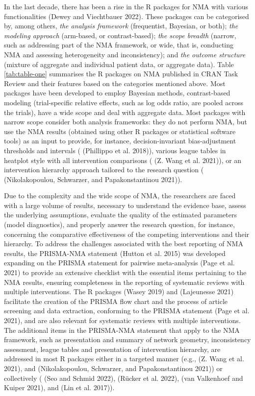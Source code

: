 In the last decade, there has been a rise in the R packages for NMA with various
functionalities (Dewey and Viechtbauer 2022). These packages can be categorised by, among
others, \emph{the analysis framework} (frequentist, Bayesian, or both);
\emph{the modeling approach} (arm-based, or contrast-based); \emph{the scope breadth}
(narrow, such as addressing part of the NMA framework, or wide, that is, conducting
NMA and assessing heterogeneity and inconsistency); and \emph{the outcome structure}
(mixture of aggregate and individual patient data, or aggregate data). Table
\ref{tab:table-one} summarises the R packages on NMA published in CRAN Task Review and their features
based on the categories mentioned above. Most packages have been developed to employ
Bayesian methods, contrast-based modeling (trial-specific relative effects, such
as log odds ratio, are pooled across the trials), have a wide scope and deal with
aggregate data. Most packages with narrow scope consider both analysis frameworks:
they do not perform NMA, but use the NMA results (obtained using other R packages
or statistical software tools) as an input to provide, for instance, decision-invariant
bias-adjustment thresholds and intervals ( (Phillippo et al. 2018)),
various league tables in heatplot style with all intervention comparisons
( (Z. Wang et al. 2021)), or an intervention hierarchy approach
tailored to the research question ( (Nikolakopoulou, Schwarzer, and Papakonstantinou 2021)).

Due to the complexity and the wide scope of NMA, the researchers are faced with
a large volume of results, necessary to understand the evidence base, assess the
underlying assumptions, evaluate the quality of the estimated parameters (model
diagnostics), and properly answer the research question, for instance, concerning
the comparative effectiveness of the competing interventions and their hierarchy.
To address the challenges associated with the best reporting of NMA results, the
PRISMA-NMA statement (Hutton et al. 2015) was developed expanding on the PRISMA statement
for pairwise meta-analysis (Page et al. 2021) to provide an extensive checklist with the
essential items pertaining to the NMA results, ensuring completeness in the reporting
of systematic reviews with multiple interventions. The R packages
 (Wasey 2019) and  (Lajeunesse 2021)
facilitate the creation of the PRISMA flow chart and the process of article screening
and data extraction, conforming to the PRISMA statement (Page et al. 2021), and are also
relevant for systematic reviews with multiple interventions. The additional items
in the PRISMA-NMA statement that apply to the NMA framework, such as presentation
and summary of network geometry, inconsistency assessment, league tables and
presentation of intervention hierarchy, are addressed in most R packages either
in a targeted manner (e.g.,  (Z. Wang et al. 2021), and
 (Nikolakopoulou, Schwarzer, and Papakonstantinou 2021)) or collectively ( (Seo and Schmid 2022),
 (Rücker et al. 2022),  (van Valkenhoef and Kuiper 2021), and 
(Lin et al. 2017)).

